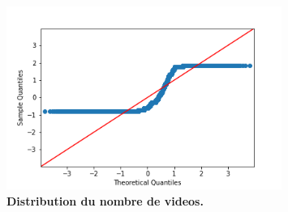 \documentclass[12pt, a4paper, titlepage, table]{article}
\begin{document}
\begin{figure}[H]
	\centering
	\includegraphics[width=0.8\textwidth]{../../graph/distribution_video4.png}
	\caption{\textbf{Distribution du nombre de videos.}}
\end{figure}
\end{document}
